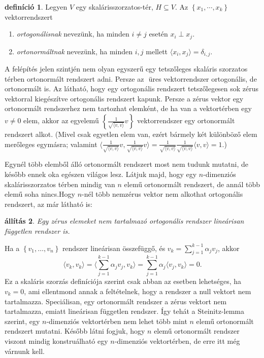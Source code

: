 \documentclass[9pt, a4paper, showtrims]{memoir}
\makeatletter
\renewenvironment{proof}[1][\proofname]
    {\par\pushQED{\qed}%
    \normalfont \topsep6\p@\@plus6\p@\relax
    \trivlist
    \item[\hskip\labelsep
        \itshape
    #1\@addpunct{:}]\ignorespaces}
    {\popQED\endtrivlist\@endpefalse}
\theoremstyle{plain}
\newtheorem{proposition}{állítás}[chapter]
\theoremstyle{remark}
\theoremstyle{definition}
\newtheorem{definition}[proposition]{definíció}
\newcommand{\ip}[2]{\langle#1,#2\rangle}
\makeatother
\begin{document}
\begin{definition}
    Legyen $V$ egy skalárisszorzatos-tér, $H\subseteq V$.
    Az $\left\{ x_1,\cdots,x_k \right\}$ vektorrendszert 
    \begin{enumerate}
        \item \emph{ortogonálisnak} nevezünk, ha minden $i\neq j$ esetén 
            $x_i\perp x_j$.
        \item \emph{ortonormáltnak} nevezünk, ha minden $i,j$ mellett $\ip{x_i}{x_j}=\delta_{i,j}$.\qedhere
    \end{enumerate}
\end{definition}
A felépítés jelen szintjén nem olyan egyszerű egy tetszőleges skaláris szorzatos térben ortonormált rendszert
adni. Persze az ${}$ üres vektorrendszer ortogonális, de ortonormált is.
Az látható, hogy egy ortogonális rendszert tetszőlegesen sok zérus vektorral kiegészítve ortogonális rendszert kapunk.
Persze a zérus vektor egy ortonormált rendszerhez nem tartozhat elemként,
de ha van a vektortérben egy $v\neq 0$ elem,
akkor az egyelemű $\left\{ \frac{1}{\sqrt{\ip{v}{v}}}v \right\}$ vektorrendszer egy ortonormált rendszert alkot.
(Mivel csak egyetlen elem van, ezért bármely két különböző elem merőleges egymásra;
valamint
$\ip{\frac{1}{\sqrt{\ip{v}{v}}}v}{\frac{1}{\sqrt{\ip{v}{v}}}v}
=
\frac{1}{\sqrt{\ip{v}{v}}}
\frac{1}{\sqrt{\ip{v}{v}}}
\ip{v}{v}=1.
$)

Egynél több elemből álló ortonormált rendszert most nem tudunk mutatni, 
de később ennek oka egészen világos lesz.
Látjuk majd, hogy egy $n$-dimenziós skalárisszorzatos térben mindig van $n$ elemű ortonormált rendszert, de annál több elemű soha nincs.Hogy $n$-nél több nemzérus vektor nem alkothat ortogonális rendszert, az már látható is:
\begin{proposition}
    Egy zérus elemeket nem tartalmazó ortogonális rendszer lineárisan független rendszer is.
\end{proposition}
\begin{proof}
    Ha a $\left\{ v_1,\dots,v_n \right\}$ rendszer lineárisan összefüggő, 
    és $v_k=\sum_{j=1}^{k-1}\alpha_jv_j$,
    akkor 
    \[
        \ip{v_k}{v_k}
        =
        \ip{\sum_{j=1}^{k-1}\alpha_jv_j}{v_k}
        =
        \sum_{j=1}^{k-1}\alpha_j\ip{v_j}{v_k}
        =0.
    \]
    Ez a skaláris szorzás definíciója szerint csak abban az esetben lehetséges, 
    ha $v_k=0$, ami ellentmond annak a feltételnek, hogy a rendszer a null vektort nem tartalmazza.
\end{proof}
Speciálisan, egy ortonormált rendszer a zérus vektort nem tartalmazza, 
emiatt lineárisan független rendszer.
Így tehát a Steinitz-lemma szerint,
egy $n$-dimenziós vektortérben nem lehet több mint $n$ elemű ortonormált rendszert mutatni.
Később látni fogjuk, 
hogy $n$ elemű ortonormált rendszer viszont mindig konstruálható egy $n$-dimenziós vektortérben,
de erre itt még várnunk kell.
\end{document}
